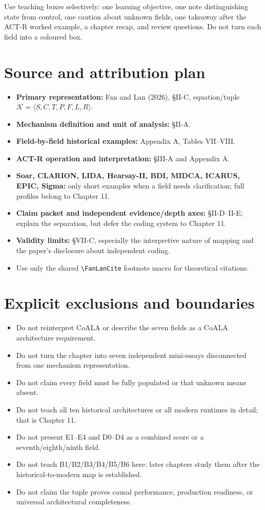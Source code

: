 Use teaching boxes selectively: one learning objective, one note distinguishing state from control, one caution about unknown fields, one takeaway after the ACT-R worked example, a chapter recap, and review questions. Do not turn each field into a coloured box.

\section{Source and attribution plan}
\begin{itemize}
  \item \textbf{Primary representation:} Fan and Lan (2026), \S II-C, equation/tuple $\mathcal{K}=\langle S,C,T,P,F,L,R\rangle$.
  \item \textbf{Mechanism definition and unit of analysis:} \S II-A.
  \item \textbf{Field-by-field historical examples:} Appendix A, Tables VII--VIII.
  \item \textbf{ACT-R operation and interpretation:} \S III-A and Appendix A.
  \item \textbf{Soar, CLARION, LIDA, Hearsay-II, BDI, MIDCA, ICARUS, EPIC, Sigma:} only short examples when a field needs clarification; full profiles belong to Chapter 11.
  \item \textbf{Claim packet and independent evidence/depth axes:} \S II-D--II-E; explain the separation, but defer the coding system to Chapter 11.
  \item \textbf{Validity limits:} \S VII-C, especially the interpretive nature of mapping and the paper's disclosure about independent coding.
  \item Use only the shared \texttt{\textbackslash FanLanCite} footnote macro for theoretical citations.
\end{itemize}

\section{Explicit exclusions and boundaries}
\begin{itemize}
  \item Do not reinterpret CoALA or describe the seven fields as a CoALA architecture requirement.
  \item Do not turn the chapter into seven independent mini-essays disconnected from one mechanism representation.
  \item Do not claim every field must be fully populated or that unknown means absent.
  \item Do not teach all ten historical architectures or all modern runtimes in detail; that is Chapter 11.
  \item Do not present E1--E4 and D0--D4 as a combined score or a seventh/eighth/ninth field.
  \item Do not teach B1/B2/B3/B4/B5/B6 here; later chapters study them after the historical-to-modern map is established.
  \item Do not claim the tuple proves causal performance, production readiness, or universal architectural completeness.
\end{itemize}

